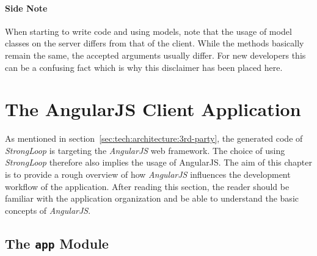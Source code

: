 \documentclass[nochapterpage,nopartpage,noheadingspace,numbersubsubsec,bigchapter,colorback,accentcolor=tud9c,10pt]{tudreport}
\begin{document}
  \paragraph{Side Note}
    When starting to write code and using models, note that the usage of model classes on the server differs from that of the client. While the methods basically remain the same, the accepted arguments usually differ. For new developers this can be a confusing fact which is why this disclaimer has been placed here.

  \section{The AngularJS Client Application}
  \label{sec:tech:implementation:angularjs}

    As mentioned in section~\ref{sec:tech:architecture:3rd-party}, the generated code of \emph{StrongLoop} is targeting the \emph{AngularJS} web framework. The choice of using \emph{StrongLoop} therefore also implies the usage of AngularJS. The aim of this chapter is to provide a rough overview of how \emph{AngularJS} influences the development workflow of the application. After reading this section, the reader should be familiar with the application organization and be able to understand the basic concepts of \emph{AngularJS}.

  \subsection{The \texttt{app} Module}
  \label{sec:tech:implementation:angularjs:app}
\end{document}
